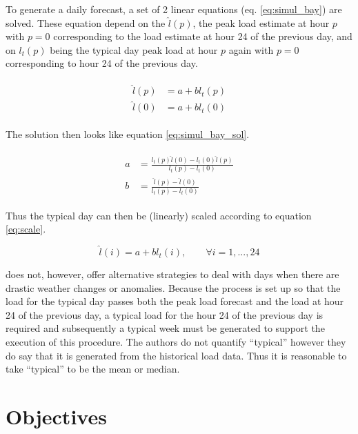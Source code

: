 To generate a daily forecast, a set of 2 linear equations (eq. \ref{eq:simul_bay}) are solved. These equation depend on the $\hat{l}(p)$, the peak load estimate at hour $p$ with $p=0$ corresponding to the load estimate at hour 24 of the previous day, and on $l_t(p)$ being the typical day peak load at hour $p$ again with $p=0$ corresponding to hour 24 of the previous day.

\begin{align} \label{eq:simul_bay}
\begin{split}
\hat{l}(p) &= a + bl_t(p) \\
\hat{l}(0) &= a + bl_t(0)
\end{split}
\end{align}

\noindent The solution then looks like equation \ref{eq:simul_bay_sol}.

\begin{align} \label{eq:simul_bay_sol}
\begin{split}
a &= \frac{l_t(p)\hat{l}(0) - l_t(0)\hat{l}(p)}{l_t(p) - l_t(0)} \\
b &= \frac{\hat{l}(p) - \hat{l}(0)}{l_t(p) - l_t(0)}
\end{split}
\end{align}

\noindent Thus the typical day can then be (linearly) scaled according to equation \ref{eq:scale}.

\begin{equation} \label{eq:scale}
\hat{l}(i) = a + bl_t(i), \qquad \forall i= 1,...,24
\end{equation}

\cite{douglas98} does not, however, offer alternative strategies to deal with days when there are drastic weather changes or anomalies. Because the process is set up so that the load for the typical day passes both the peak load forecast and the load at hour 24 of the previous day, a typical load for the hour 24 of the previous day is required and subsequently a typical week must be generated to support the execution of this procedure. The authors do not quantify ``typical'' however they do say that it is generated from the historical load data. Thus it is reasonable to take ``typical'' to be the mean or median.

\section{Objectives} \label{subsec:objectives}


